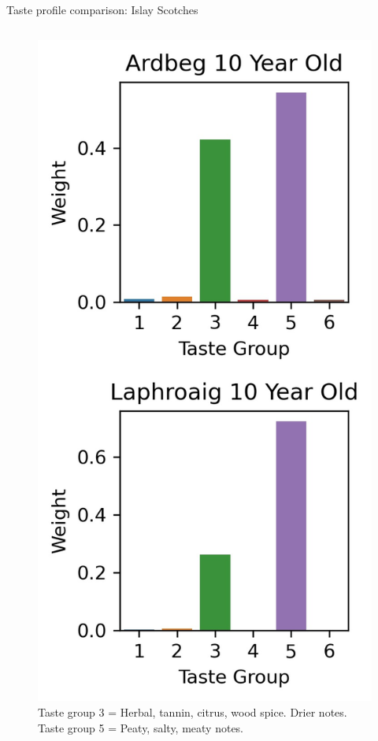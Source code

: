 \documentclass{beamer}
\begin{document}
\begin{frame}{Taste profile comparison: Islay Scotches}
\begin{columns}
\begin{column}{0.6\textwidth}
\begin{figure}[H]
\begin{center}
					\includegraphics[scale = 0.5]{islaycomptopics}
					\caption{Taste group 3 = Herbal, tannin, citrus, wood spice. Drier notes. Taste group 5 = Peaty, salty, meaty notes.}
			\end{center}
			\end{figure}
		\end{column}
		
		
	\end{columns}
\end{frame}
\end{document}
